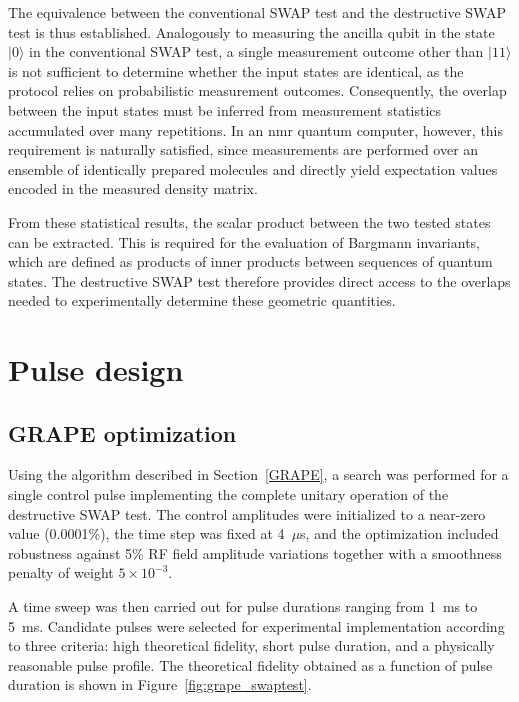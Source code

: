 The equivalence between the conventional SWAP test and the destructive SWAP test is thus established. Analogously to measuring the ancilla qubit in the state \(|0\rangle\) in the conventional SWAP test, a single measurement outcome other than \(|11\rangle\) is not sufficient to determine whether the input states are identical, as the protocol relies on probabilistic measurement outcomes. Consequently, the overlap between the input states must be inferred from measurement statistics accumulated over many repetitions. In an \acs{nmr} quantum computer, however, this requirement is naturally satisfied, since measurements are performed over an ensemble of identically prepared molecules and directly yield expectation values encoded in the measured density matrix.

From these statistical results, the scalar product between the two tested states can be extracted. This is required for the evaluation of Bargmann invariants, which are defined as products of inner products between sequences of quantum states. The destructive SWAP test therefore provides direct access to the overlaps needed to experimentally determine these geometric quantities.

\section{Pulse design}
\label{sec:pulse_design}

\subsection{GRAPE optimization}
\label{subsec:grape_optimization}

Using the algorithm described in Section~\ref{GRAPE}, a search was performed for a single control pulse implementing the complete unitary operation of the destructive SWAP test. The control amplitudes were initialized to a near-zero value (0.0001\%), the time step was fixed at 4~\(\mu\)s, and the optimization included robustness against 5\% RF field amplitude variations together with a smoothness penalty of weight \(5\times10^{-3}\).

A time sweep was then carried out for pulse durations ranging from 1~ms to 5~ms. Candidate pulses were selected for experimental implementation according to three criteria: high theoretical fidelity, short pulse duration, and a physically reasonable pulse profile. The theoretical fidelity obtained as a function of pulse duration is shown in Figure~\ref{fig:grape_swaptest}.

